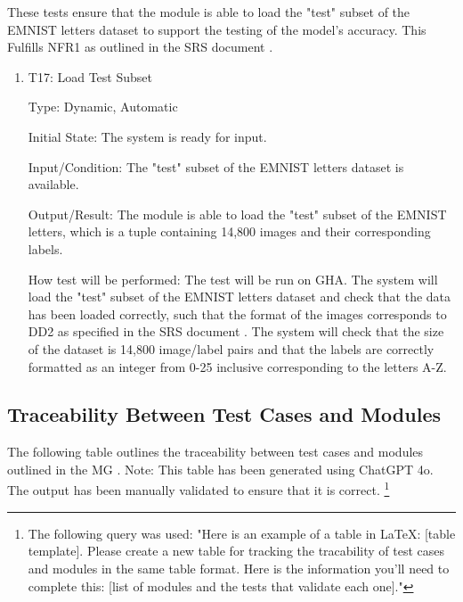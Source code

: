 \documentclass[12pt, titlepage]{article}
\begin{document}
These tests ensure that the module is able to load the "test" subset of the
EMNIST letters dataset to support the testing of the model's accuracy. This
Fulfills NFR1 as outlined in the SRS document \citep{SRS}.

\begin{enumerate}

\item{T17: Load Test Subset\\}

Type: Dynamic, Automatic

Initial State: The \progname{} system is ready for input.

Input/Condition: The "test" subset of the EMNIST letters dataset is available.

Output/Result: The module is able to load the "test" subset of the EMNIST
letters, which is a tuple containing 14,800 images and their corresponding
labels.

How test will be performed: The test will be run on GHA. The system will load
the "test" subset of the EMNIST letters dataset and check that the data has been
loaded correctly, such that the format of the images corresponds to DD2 as
specified in the SRS document \citep{SRS}. The system will check that the size
of the dataset is 14,800 image/label pairs and that the labels are correctly
formatted as an integer from 0-25 inclusive corresponding to the letters A-Z.

\end{enumerate}


\subsection{Traceability Between Test Cases and Modules}

The following table outlines the traceability between test cases and modules
outlined in the MG \citep{MG}. Note: This table has been generated using ChatGPT
4o. The output has been manually validated to ensure that it is correct.
\footnote{The following query was used: "Here is an example of a table in LaTeX:
[table template]. Please create a new table for tracking the tracability of test cases and modules in the same table format. Here is the information you'll need to complete this: [list of modules and the tests that validate each one]."}

\end{document}

